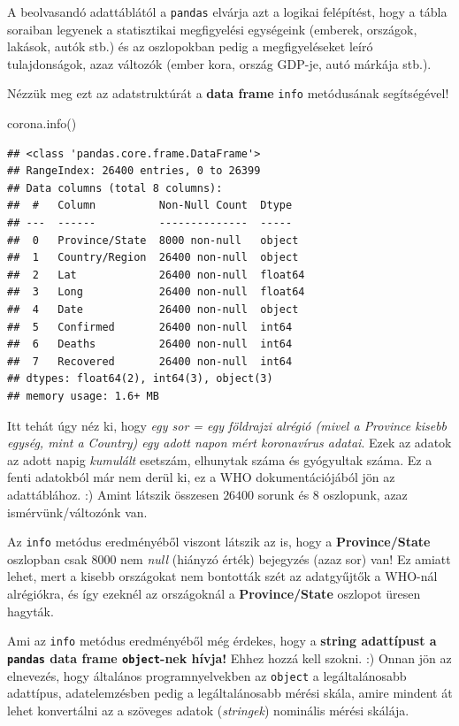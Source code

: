 \documentclass[
]{book}
\newenvironment{Shaded}{\begin{snugshade}}{\end{snugshade}}
\newcommand{\NormalTok}[1]{#1}
\begin{document}
A beolvasandó adattáblától a \texttt{pandas} elvárja azt a logikai felépítést, hogy a tábla soraiban legyenek a statisztikai megfigyelési egységeink (emberek, országok, lakások, autók stb.) és az oszlopokban pedig a megfigyeléseket leíró tulajdonságok, azaz változók (ember kora, ország GDP-je, autó márkája stb.).

Nézzük meg ezt az adatstruktúrát a \textbf{data frame} \texttt{info} metódusának segítségével!

\begin{Shaded}
\begin{Highlighting}[]
\NormalTok{corona.info()}
\end{Highlighting}
\end{Shaded}

\begin{verbatim}
## <class 'pandas.core.frame.DataFrame'>
## RangeIndex: 26400 entries, 0 to 26399
## Data columns (total 8 columns):
##  #   Column          Non-Null Count  Dtype  
## ---  ------          --------------  -----  
##  0   Province/State  8000 non-null   object 
##  1   Country/Region  26400 non-null  object 
##  2   Lat             26400 non-null  float64
##  3   Long            26400 non-null  float64
##  4   Date            26400 non-null  object 
##  5   Confirmed       26400 non-null  int64  
##  6   Deaths          26400 non-null  int64  
##  7   Recovered       26400 non-null  int64  
## dtypes: float64(2), int64(3), object(3)
## memory usage: 1.6+ MB
\end{verbatim}

Itt tehát úgy néz ki, hogy \emph{egy sor = egy földrajzi alrégió (mivel a Province kisebb egység, mint a Country) egy adott napon mért koronavírus adatai}. Ezek az adatok az adott napig \emph{kumulált} esetszám, elhunytak száma és gyógyultak száma. Ez a fenti adatokból már nem derül ki, ez a WHO dokumentációjából jön az adattáblához. :) Amint látszik összesen \(26400\) sorunk és \(8\) oszlopunk, azaz ismérvünk/változónk van.

Az \texttt{info} metódus eredményéből viszont látszik az is, hogy a \textbf{Province/State} oszlopban csak \(8000\) nem \emph{null} (hiányzó érték) bejegyzés (azaz sor) van! Ez amiatt lehet, mert a kisebb országokat nem bontották szét az adatgyűjtők a WHO-nál alrégiókra, és így ezeknél az országoknál a \textbf{Province/State} oszlopot üresen hagyták.

Ami az \texttt{info} metódus eredményéből még érdekes, hogy a \textbf{string adattípust a \texttt{pandas} data frame \texttt{object}-nek hívja!} Ehhez hozzá kell szokni. :) Onnan jön az elnevezés, hogy általános programnyelvekben az \texttt{object} a legáltalánosabb adattípus, adatelemzésben pedig a legáltalánosabb mérési skála, amire mindent át lehet konvertálni az a szöveges adatok (\emph{stringek}) nominális mérési skálája.
\end{document}
